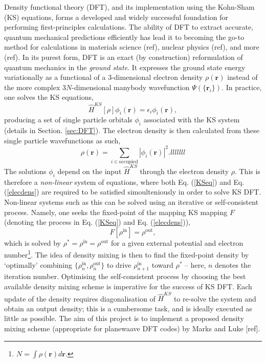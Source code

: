\documentclass[final,3p,twocolumn]{elsarticle}
\begin{document}
Density functional theory (DFT), and its implementation using the Kohn-Sham (KS) equations, forms a developed and widely successful foundation for performing first-principles calculations. The ability of DFT to extract accurate, quantum mechanical predictions efficiently has lead it to becoming the go-to method for calculations in materials science (ref), nuclear physics (ref), and more (ref). In its purest form, DFT is an exact (by construction) reformulation of quantum mechanics in the \textit{ground state}. It expresses the ground state energy variationally as a functional of a 3-dimensional electron density $\rho(\textbf{r})$ instead of the more complex $3N$-dimensional manybody wavefunction $\Psi( \{\textbf{r}_i \} )$. In practice, one solves the KS equations,
\begin{equation} \label{KSeq}
\hat{H}^{KS}[\rho] \phi_i(\textbf{r}) = \epsilon_i \phi_i(\textbf{r}),
\end{equation}
producing a set of single particle orbitals $\phi_i$ associated with the KS system (details in Section$.$ \ref{sec:DFT}). The electron density is then calculated from these single particle wavefunctions as such,
\begin{equation}\label{elecdens}
\rho(\textbf{r}) = \sum_{i \in \text{occupied}} |  \phi_i(\textbf{r}) |^2. lllllll
\end{equation}
The solutions $\phi_i$ depend on the input $\hat{H}^{KS}$ through the electron density $\rho$. This is therefore a \textit{non-linear} system of equations, where both Eq$.$ (\ref{KSeq}) and Eq$.$ (\ref{elecdens}) are required to be satisfied simoulteniously in order to solve KS DFT. Non-linear systems such as this can be solved using an iterative or self-consistent process. Namely, one seeks the fixed-point of the mapping KS mapping $F$ (denoting the process in Eq$.$ (\ref{KSeq}) and Eq$.$ (\ref{elecdens})),
\begin{equation}
F[\rho^{\text{in}}] = \rho^{\text{out}}, 
\end{equation}
which is solved by $\rho^* = \rho^{\text{in}} = \rho^{\text{out}}$ for a given external potential and electron number\footnote{$N = \int \rho(\textbf{r}) d\textbf{r}$.}. The idea of density mixing is then to find the fixed-point density by `optimally' combining $ \{ \rho_n^{\text{in}},\rho_n^{\text{out}} \}$ to drive $\rho^{\text{in}}_{n+1}$ toward $\rho^*$ -- here, $n$ denotes the iteration number. Optimising the self-consistent process by choosing the best available density mixing scheme is imperative for the success of KS DFT. Each update of the density requires diagonalisation of $\hat{H}^{KS}$ to re-solve the system and obtain an output density; this is a cumbersome task, and is ideally executed as little as possible. The aim of this project is to implement a proposed density mixing scheme (appropriate for planewaave DFT codes) by Marks and Luke [ref]. 
\end{document}
